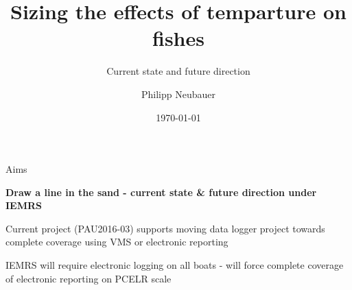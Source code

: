 \documentclass[xcolor={table}]{beamer}
\title{Sizing the effects of temparture on fishes}
\subtitle{Current state and future direction}
\author{Philipp Neubauer}
\date{\today}
\newcommand{\p}{\bigskip\par}
\begin{document}

\titleslide

\begin{frame}{Aims}

  {\bf Draw a line in the sand - current state \& future
    direction under IEMRS}
  \p

  Current project (PAU2016-03) supports moving data logger project towards
    complete coverage using VMS or electronic reporting
  \p

  IEMRS will require electronic logging on all boats - will
    force complete coverage of electronic reporting on PCELR scale
  
\end{frame}
\end{document}
